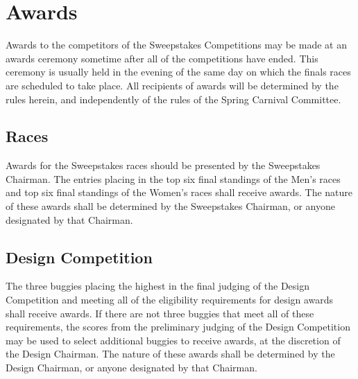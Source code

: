 \chapter{Awards}

	Awards to the competitors of the Sweepstakes Competitions may be made at an awards ceremony sometime after all of the competitions have ended. This ceremony is usually held in the evening of the same day on which the finals races are scheduled to take place. All recipients of awards will be determined by the rules herein, and independently of the rules of the Spring Carnival Committee.

\section{Races}

	Awards for the Sweepstakes races should be presented by the Sweepstakes Chairman. The entries placing in the top six final standings of the Men's races and top six final standings of the Women's races shall receive awards. The nature of these awards shall be determined by the Sweepstakes Chairman, or anyone designated by that Chairman.


\section{Design Competition}

	The three buggies placing the highest in the final judging of the Design Competition and meeting all of the eligibility requirements for design awards shall receive awards. If there are not three buggies that meet all of these requirements, the scores from the preliminary judging of the Design Competition may be used to select additional buggies to receive awards, at the discretion of the Design Chairman. The nature of these awards shall be determined by the Design Chairman, or anyone designated by that Chairman.

